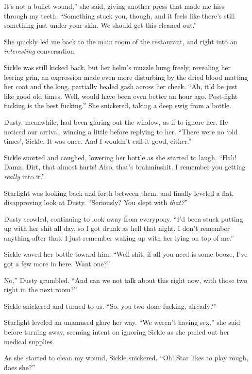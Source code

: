\leavevmode{}It’s not a bullet wound,” she said, giving another press that made me hiss through my teeth. “Something stuck you, though, and it feels like there’s still something just under your skin. We should get this cleaned out.”

She quickly led me back to the main room of the restaurant, and right into an \textit{interesting} conversation.

Sickle was still kicked back, but her helm’s muzzle hung freely, revealing her leering grin, an expression made even more disturbing by the dried blood matting her coat and the long, partially healed gash across her cheek. “Ah, it’d be just like good old times. Well, would have been even better an hour ago. Post-fight fucking is the best fucking.” She snickered, taking a deep swig from a bottle.

Dusty, meanwhile, had been glaring out the window, as if to ignore her. He noticed our arrival, wincing a little before replying to her. “There were no ‘old times’, Sickle. It was once. And I wouldn’t call it good, either.”

Sickle snorted and coughed, lowering her bottle as she started to laugh. “Hah! Damn, Dirt, that almost hurts! Also, that’s brahminshit. I remember you getting \textit{really} into it.”

Starlight was looking back and forth between them, and finally leveled a flat, disapproving look at Dusty. “Seriously? You slept with \textit{that?}”

Dusty scowled, continuing to look away from everypony. “I’d been stuck putting up with her shit all day, so I got drunk as hell that night. I don’t remember anything after that. I just remember waking up with her lying on top of me.”

Sickle waved her bottle toward him. “Well shit, if all you need is some booze, I’ve got a few more in here. Want one?”

\leavevmode{}No,” Dusty grumbled. “And can we not talk about this right now, with those two right in the next room?”

Sickle snickered and turned to us. “So, you two done fucking, already?”

Starlight leveled an unamused glare her way. “We weren’t having sex,” she said before turning away, seeming intent on ignoring Sickle as she pulled out her medical supplies.

As she started to clean my wound, Sickle snickered. “Oh! Star likes to play rough, does she?”

